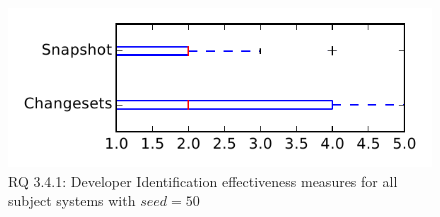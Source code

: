 
\begin{figure}
\centering
\includegraphics[height=0.4\textheight]{figures/dit_seed/rq1_tiny_50}
\caption{RQ 3.4.1: Developer Identification effectiveness measures for all subject systems with $seed=50$}
\label{fig:dit_seed:rq1:tiny}
\end{figure}
